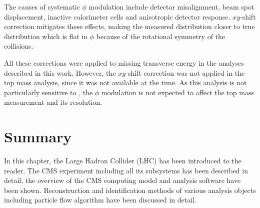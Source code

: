 The causes of systematic \MET $\phi$ modulation include detector misalignment, beam spot displacement, inactive
calorimeter cells and anisotropic detector response. $xy$-shift correction mitigates these effects, making the measured
\MET distribution closer to true \MET distribution which is flat in $\phi$ because of the rotational symmetry of the
collisions.

All these corrections were applied to missing transverse energy in the analyses described in this work. However, the
$xy$-shift correction was not applied in the top mass analysis, since it was not available at the time. As this analysis
is not particularly sensitive to \MET, the $\phi$ modulation is not expected to affect the top mass measurement and its
resolution.

\section{Summary}
In this chapter, the Large Hadron Collider (LHC) has been introduced to the reader. The CMS experiment including all its
subsystems has been described in detail, the overview of the CMS computing model and analysis software have been shown.
Reconstruction and identification methods of various analysis objects including particle flow algorithm have been
discussed in detail.


